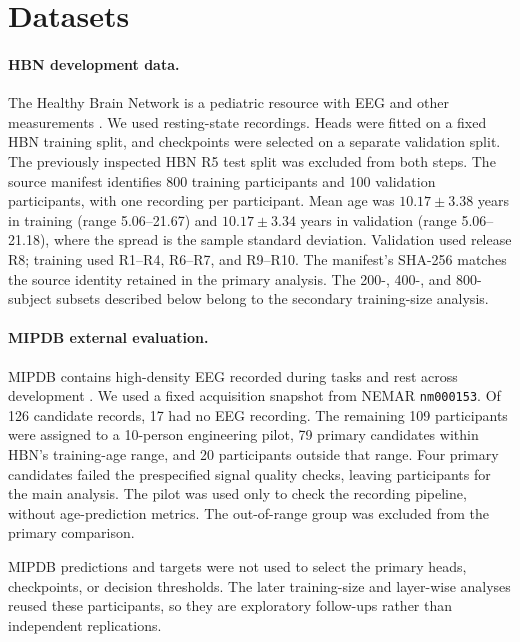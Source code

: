 \section{Datasets}

\paragraph{HBN development data.}
The Healthy Brain Network is a pediatric resource with EEG and other
measurements \citep{alexander2017hbn}. We used resting-state recordings.
Heads were fitted on a fixed HBN training
split, and checkpoints were selected on a separate validation split. The
previously inspected HBN R5 test split was excluded from both steps.
The source manifest identifies 800 training participants and 100 validation
participants, with one recording per participant. Mean age was
$10.17 \pm 3.38$ years in training (range 5.06--21.67) and
$10.17 \pm 3.34$ years in validation (range 5.06--21.18), where the spread is
the sample standard deviation. Validation used release R8; training used
R1--R4, R6--R7, and R9--R10. The manifest's SHA-256 matches the source identity
retained in the primary analysis. The 200-, 400-, and 800-subject subsets
described below belong to the secondary training-size analysis.

\paragraph{MIPDB external evaluation.}
MIPDB contains high-density EEG recorded during tasks and rest across development
\citep{langer2017mipdb}. We used a fixed acquisition snapshot from NEMAR
\texttt{nm000153}. Of 126 candidate records, 17 had no EEG recording. The
remaining 109 participants were assigned to a 10-person engineering pilot,
79 primary candidates within HBN's training-age range, and 20 participants
outside that range. Four primary candidates failed the prespecified signal
quality checks, leaving \PrimarySubjects{} participants for the main analysis.
The pilot was used only to check the recording pipeline, without age-prediction
metrics. The out-of-range group was excluded from the primary comparison.

\begin{table}[tbp]
  \centering
  \caption{MIPDB groups after allocation and signal quality checks.}
  \label{tab:cohorts}
  
\end{table}

MIPDB predictions and targets were not used to select the primary heads,
checkpoints, or decision thresholds. The later training-size and layer-wise
analyses reused these participants, so they are exploratory follow-ups rather
than independent replications.

